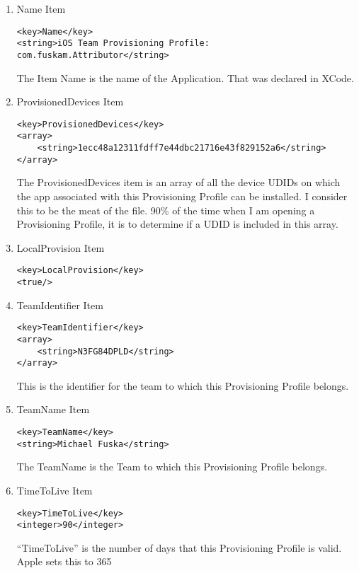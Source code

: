\begin{enumerate}
    \item Name Item
\begin{lstlisting}[caption={Name Item}]
<key>Name</key>
<string>iOS Team Provisioning Profile: com.fuskam.Attributor</string>
\end{lstlisting}
The Item Name is the name of the Application. That was declared in XCode.

    \item ProvisionedDevices Item
\begin{lstlisting}[caption={ProvisionedDevices Item}]
<key>ProvisionedDevices</key>
<array>
    <string>1ecc48a12311fdff7e44dbc21716e43f829152a6</string>
</array>
\end{lstlisting}
The ProvisionedDevices item is an array of all the device UDIDs on which the app associated with this Provisioning Profile can be installed.  I consider this to be the meat of the file. 90\% of the time when I am opening a Provisioning Profile, it is to determine if a UDID is included in this array.

  \item LocalProvision Item
\begin{lstlisting}[caption={LocalProvision Item}]
<key>LocalProvision</key>
<true/>
\end{lstlisting}

    \item TeamIdentifier Item
\begin{lstlisting}[caption={TeamIdentifier Item}]
<key>TeamIdentifier</key>
<array>
    <string>N3FG84DPLD</string>
</array>
\end{lstlisting}
This is the identifier for the team to which this Provisioning Profile belongs.

    \item TeamName Item
\begin{lstlisting}[caption={TeamName Item}]
<key>TeamName</key>
<string>Michael Fuska</string>
\end{lstlisting}
 The TeamName is the Team to which this Provisioning Profile belongs.

   \item TimeToLive Item
\begin{lstlisting}[caption={TimeToLive Item}]
<key>TimeToLive</key>
<integer>90</integer>
\end{lstlisting}
“TimeToLive” is the number of days that this Provisioning Profile is valid. Apple sets this to 365
 

\end{enumerate}
